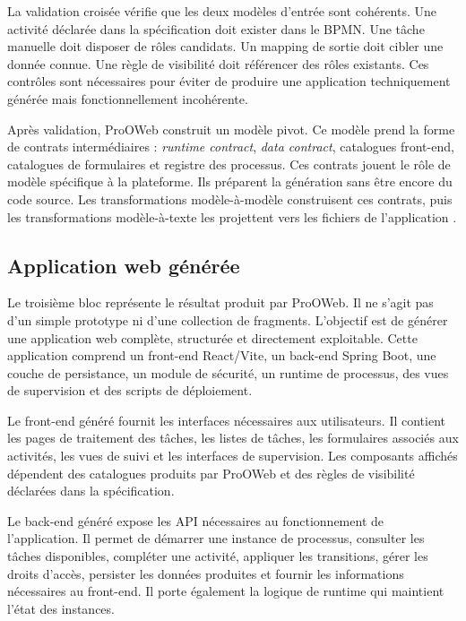 La validation croisée vérifie que les deux modèles d'entrée sont cohérents. Une activité déclarée dans la spécification doit exister dans le BPMN. Une tâche manuelle doit disposer de rôles candidats. Un mapping de sortie doit cibler une donnée connue. Une règle de visibilité doit référencer des rôles existants. Ces contrôles sont nécessaires pour éviter de produire une application techniquement générée mais fonctionnellement incohérente.

Après validation, ProOWeb construit un modèle pivot. Ce modèle prend la forme de contrats intermédiaires : \textit{runtime contract}, \textit{data contract}, catalogues front-end, catalogues de formulaires et registre des processus. Ces contrats jouent le rôle de modèle spécifique à la plateforme. Ils préparent la génération sans être encore du code source. Les transformations modèle-à-modèle construisent ces contrats, puis les transformations modèle-à-texte les projettent vers les fichiers de l'application \cite{omgqvt,syriani2018}.

\subsection{Application web générée}

Le troisième bloc représente le résultat produit par ProOWeb. Il ne s'agit pas d'un simple prototype ni d'une collection de fragments. L'objectif est de générer une application web complète, structurée et directement exploitable. Cette application comprend un front-end React/Vite, un back-end Spring Boot, une couche de persistance, un module de sécurité, un runtime de processus, des vues de supervision et des scripts de déploiement.

Le front-end généré fournit les interfaces nécessaires aux utilisateurs. Il contient les pages de traitement des tâches, les listes de tâches, les formulaires associés aux activités, les vues de suivi et les interfaces de supervision. Les composants affichés dépendent des catalogues produits par ProOWeb et des règles de visibilité déclarées dans la spécification.

Le back-end généré expose les API nécessaires au fonctionnement de l'application. Il permet de démarrer une instance de processus, consulter les tâches disponibles, compléter une activité, appliquer les transitions, gérer les droits d'accès, persister les données produites et fournir les informations nécessaires au front-end. Il porte également la logique de runtime qui maintient l'état des instances.

